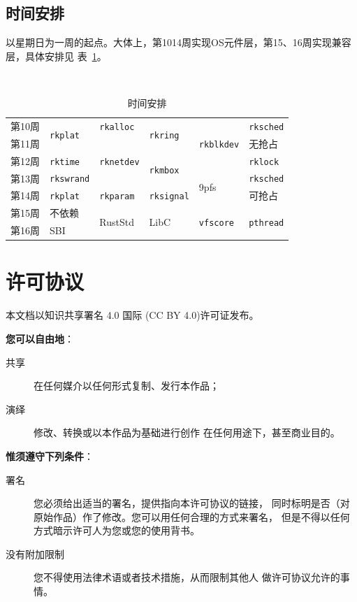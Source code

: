 \documentclass{../runikraft-report}
\begin{document}
\subsection{时间安排}
以星期日为一周的起点。大体上，第10\tildechar14周实现OS元件层，第15、16周实现兼容层，具体安排见
表\ \ref{table:schedule}。
\begin{table}[!hbt]
\centering
\caption{时间安排}\ \label{table:schedule}
\begin{tabular}{|r|l|l|l|l|l|}
\hline
第10周&\multirow{2}{*}{\texttt{rkplat}}&\texttt{rkalloc}&\multirow{2}{*}{\texttt{rkring}}&\multirow{3}{*}{\texttt{rkblkdev}}&\texttt{rksched}\\\cline{1-1}\cline{3-3}
第11周&&\multirow{3}{*}{\texttt{rknetdev}}&&&无抢占\\\cline{1-2}\cline{4-4}\cline{6-6}
第12周&\texttt{rktime}&&\multirow{2}{*}{\texttt{rkmbox}}&&\texttt{rklock}\\\cline{1-2}\cline{5-6}
第13周&\texttt{rkswrand}&&&\multirow{2}{*}{9pfs}&\texttt{rksched}\\\cline{1-4}
第14周&\texttt{rkplat}&\texttt{rkparam}&\texttt{rksignal}&&可抢占\\\cline{1-1}\cline{3-6}
第15周&不依赖&\multirow{2}{*}{RustStd}&\multirow{2}{*}{LibC}&\multirow{2}{*}{\texttt{vfscore}}&\multirow{2}{*}{\texttt{pthread}}\\\cline{1-1}
第16周&SBI&&&&\\\hline
\end{tabular}
\end{table}

\section*{许可协议}
本文档以知识共享署名 4.0 国际 (CC BY 4.0)许可证发布。

\vspace{2ex}
\noindent\textbf{\large 您可以自由地}：
\begin{description}
\item[共享] 在任何媒介以任何形式复制、发行本作品；
\item[演绎] 修改、转换或以本作品为基础进行创作
在任何用途下，甚至商业目的。
\end{description}

\vspace{2ex}
\noindent\textbf{\large 惟须遵守下列条件}：
\begin{description}
\item[署名] 您必须给出适当的署名，提供指向本许可协议的链接，
同时标明是否（对原始作品）作了修改。您可以用任何合理的方式来署名，
但是不得以任何方式暗示许可人为您或您的使用背书。
\item[没有附加限制] 您不得使用法律术语或者技术措施，从而限制其他人
做许可协议允许的事情。
\end{description}
\end{document}
